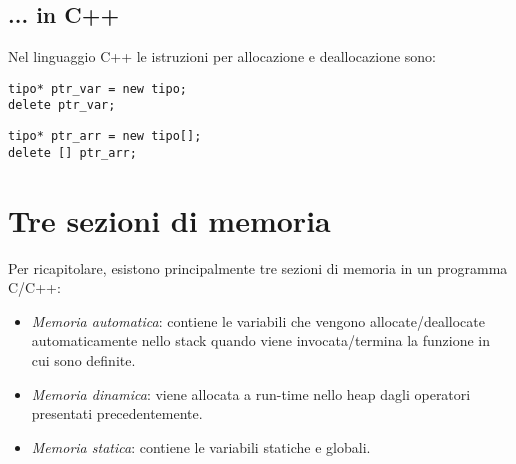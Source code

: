 \subsection{... in C++}
Nel linguaggio C++ le istruzioni per allocazione e deallocazione sono:
\begin{lstlisting}[title={Allocazione e deallocazione dinamica di una variabile in C++}]
tipo* ptr_var = new tipo;
delete ptr_var;
\end{lstlisting}
\begin{lstlisting}[title={Allocazione e deallocazione dinamica di un vettore in C++}]
tipo* ptr_arr = new tipo[];
delete [] ptr_arr;
\end{lstlisting}

\section{Tre sezioni di memoria}
Per ricapitolare, esistono principalmente tre sezioni di memoria in un programma C/C++:
\begin{itemize}
	\item \textit{Memoria automatica}: contiene le variabili che vengono allocate/deallocate automaticamente nello stack quando viene invocata/termina la funzione in cui sono definite.
	\item \textit{Memoria dinamica}: viene allocata a run-time nello heap dagli operatori presentati precedentemente.
	\item \textit{Memoria statica}: contiene le variabili statiche e globali.
\end{itemize}


